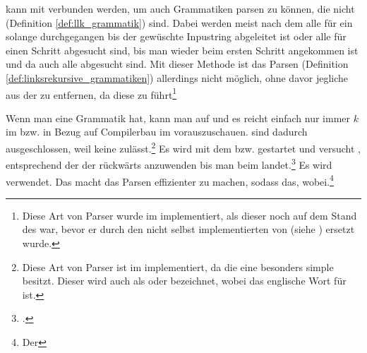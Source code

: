 \begin{Special_Paragraph}
\begin{itemize}[itemsep=-1mm, topsep=-1mm]
   kann mit  verbunden werden, um auch Grammatiken parsen zu können, die nicht  (Definition \ref{def:llk_grammatik}) sind. Dabei werden meist nach dem  alle  für ein  solange durchgegangen bis der gewüschte Inpustring abgeleitet ist oder alle  für einen Schritt abgesucht sind, bis man wieder beim ersten Schritt angekommen ist und da auch alle  abgesucht sind. Mit dieser Methode ist das Parsen  (Definition \ref{def:linksrekursive_grammatiken}) allerdings nicht möglich, ohne davor jegliche  aus der  zu entfernen, da diese zu  führt\footnote{Diese Art von Parser wurde im  implementiert, als dieser noch auf dem Stand des  war, bevor er durch den nicht selbst implementierten  von  (siehe \cite{noauthor_lark_2022}) ersetzt wurde.}

  Wenn man eine  Grammatik hat, kann man auf  und es reicht einfach nur immer $k$  im  bzw. in Bezug auf Compilerbau  im  vorauszuschauen.  sind dadurch ausgeschlossen, weil  keine  zulässt.\footnote{Diese Art von Parser ist im  implementiert, da die  eine besonders simple  besitzt. Dieser  wird auch als  oder  bezeichnet, wobei  das englische Wort für  ist.}
   Es wird mit dem  bzw.  gestartet und versucht , entsprechend der  der  rückwärts anzuwenden bis man beim  landet.\footcite{noauthor_what_nodate-1}
   Es wird  verwendet. Das macht das Parsen effizienter  zu machen, sodass das, wobei.\footnote{Der }
\end{itemize}
\end{Special_Paragraph}

